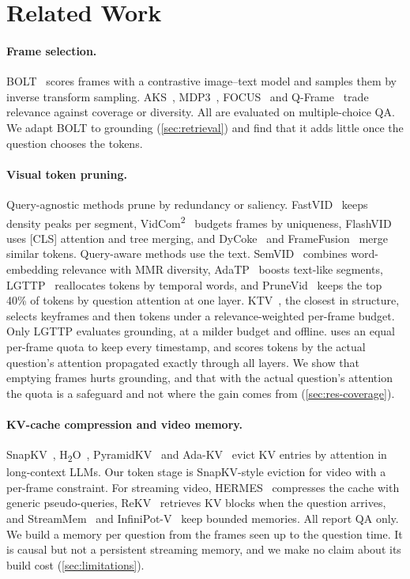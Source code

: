 \section{Related Work}
\label{sec:related}

\paragraph{Frame selection.}
BOLT~\cite{bolt} scores frames with a contrastive image--text model and samples them by inverse transform sampling.
AKS~\cite{aks}, MDP3~\cite{mdp3}, FOCUS~\cite{focus} and Q-Frame~\cite{qframe} trade relevance against coverage or
diversity. All are evaluated on multiple-choice QA. We adapt BOLT to grounding (\cref{sec:retrieval}) and find that it
adds little once the question chooses the tokens.

\paragraph{Visual token pruning.}
Query-agnostic methods prune by redundancy or saliency. FastVID~\cite{fastvid} keeps density peaks per segment,
VidCom\textsuperscript{2}~\cite{vidcom2} budgets frames by uniqueness, FlashVID~\cite{flashvid} uses [CLS] attention
and tree merging, and DyCoke~\cite{dycoke} and FrameFusion~\cite{framefusion} merge similar tokens. Query-aware methods
use the text. SemVID~\cite{semvid} combines word-embedding relevance with MMR diversity, AdaTP~\cite{adatp} boosts
text-like segments, LGTTP~\cite{lgttp} reallocates tokens by temporal words, and PruneVid~\cite{prunevid} keeps the
top 40\% of tokens by question attention at one layer. KTV~\cite{ktv}, the closest in structure, selects keyframes and
then tokens under a relevance-weighted per-frame budget. Only LGTTP evaluates grounding, at a milder budget and
offline. \method uses an equal per-frame quota to keep every timestamp, and scores tokens by the actual question's
attention propagated exactly through all layers. We show that emptying frames hurts grounding, and that with the
actual question's attention the quota is a safeguard and not where the gain comes from (\cref{sec:res-coverage}).

\paragraph{KV-cache compression and video memory.}
SnapKV~\cite{snapkv}, H\textsubscript{2}O~\cite{h2o}, PyramidKV~\cite{pyramidkv} and Ada-KV~\cite{adakv} evict KV
entries by attention in long-context LLMs. Our token stage is SnapKV-style eviction for video with a per-frame
constraint. For streaming video, HERMES~\cite{hermes} compresses the cache with generic pseudo-queries,
ReKV~\cite{rekv} retrieves KV blocks when the question arrives, and StreamMem~\cite{streammem} and
InfiniPot-V~\cite{infinipotv} keep bounded memories. All report QA only. We build a memory per question from the
frames seen up to the question time. It is causal but not a persistent streaming memory, and we make no claim about
its build cost (\cref{sec:limitations}).

